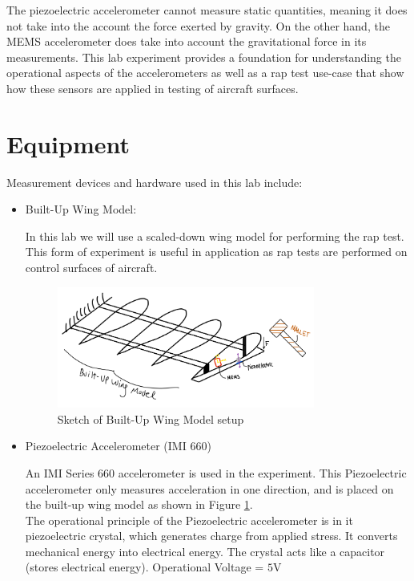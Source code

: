 \documentclass{article}
\begin{document}
The piezoelectric accelerometer cannot measure static quantities, meaning it does not take into the account the force exerted by gravity. On the other hand, the MEMS accelerometer does take into account the gravitational force in its measurements. This lab experiment provides a foundation for understanding the operational aspects of the accelerometers as well as a rap test use-case that show how these sensors are applied in testing of aircraft surfaces.

\section{Equipment}
Measurement devices and hardware used in this lab include:
\begin{itemize}

\item Built-Up Wing Model: 
\vspace{1mm}

In this lab we will use a scaled-down wing model for performing the rap test. This form of experiment is useful in application as rap tests are performed on control surfaces of aircraft.

\begin{figure}[H]
    \centering
    \includegraphics[width = 0.8\textwidth]{lab6images/wingmodellab6.png}
    \caption{Sketch of Built-Up Wing Model setup}
    \label{fig:wingmodel}
\end{figure}
\vspace{2.5mm}

\item Piezoelectric Accelerometer (IMI 660)
\vspace{1mm}

An IMI Series 660 accelerometer is used in the experiment. This Piezoelectric accelerometer only measures acceleration in one direction, and is placed on the built-up wing model as shown in Figure \ref{fig:wingmodel}.\\[1mm]
The operational principle of the Piezoelectric accelerometer is in it piezoelectric crystal, which generates charge from applied stress. It converts mechanical energy into electrical energy. The crystal acts like a capacitor (stores electrical energy). Operational Voltage = $5\text{V}$
\vspace{2.5mm}


\end{itemize}
\end{document}
